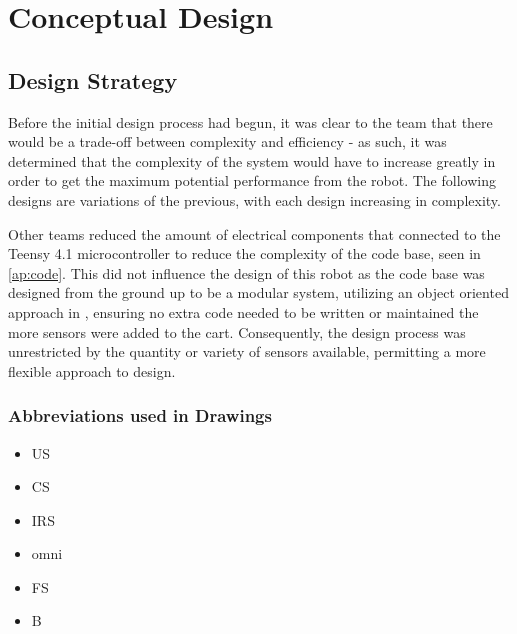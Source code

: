 \documentclass[11pt]{report}
\begin{document}
\chapter{Conceptual Design}\label{ch:conceptual-design}

\section*{Design Strategy}
Before the initial design process had begun, it was clear to the team that there would be a trade-off between complexity and efficiency - as such, it was determined that the complexity of the system would have to increase greatly in order to get the maximum potential performance from the robot. The following designs are variations of the previous, with each design increasing in complexity.
\par Other teams reduced the amount of electrical components that connected to the Teensy 4.1 microcontroller to reduce the complexity of the code base, seen in \cref{ap:code}. This did not influence the design of this robot as the code base was designed from the ground up to be a modular system, utilizing an object oriented approach in \cplusplus{}, ensuring no extra code needed to be written or maintained the more sensors were added to the cart. Consequently, the design process was unrestricted by the quantity or variety of sensors available, permitting a more flexible approach to design.

\subsection*{Abbreviations used in Drawings}
\begin{itemize}
    \item \gls{US}
    \item \gls{CS}
    \item \gls{IRS}
    \item \gls{omni}
    \item \gls{FS}
    \item \gls{B}
\end{itemize}

\newpage
\end{document}
